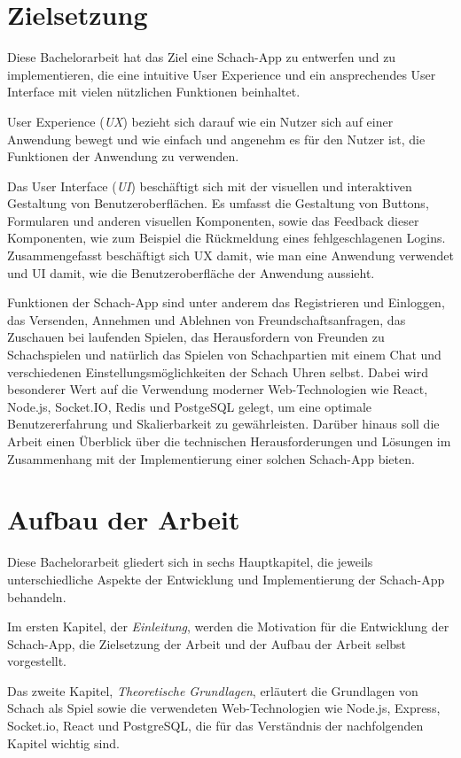 \documentclass[a4paper,12pt]{report}
\begin{document}
    \section{Zielsetzung}
    Diese Bachelorarbeit hat das Ziel eine Schach-App zu entwerfen und zu implementieren, die eine intuitive User Experience und ein ansprechendes User Interface mit vielen nützlichen Funktionen beinhaltet.
    
    User Experience (\textit{UX}) bezieht sich darauf wie ein Nutzer sich auf einer Anwendung bewegt und wie einfach und angenehm es für den Nutzer ist, die Funktionen der Anwendung zu verwenden.
    
    Das User Interface (\textit{UI}) beschäftigt sich mit der visuellen und interaktiven Gestaltung von Benutzeroberflächen. Es umfasst die Gestaltung von Buttons, Formularen und anderen visuellen Komponenten, sowie das Feedback dieser Komponenten, wie zum Beispiel die Rückmeldung eines fehlgeschlagenen Logins.
    Zusammengefasst beschäftigt sich UX damit, wie man eine Anwendung verwendet und UI damit, wie die Benutzeroberfläche der Anwendung aussieht.\cite{webdesign}
        
        Funktionen der Schach-App sind unter anderem das Registrieren und Einloggen, das Versenden, Annehmen und Ablehnen von Freundschaftsanfragen, das Zuschauen bei laufenden Spielen, das Herausfordern von Freunden zu Schachspielen und natürlich das Spielen von Schachpartien mit einem Chat und verschiedenen Einstellungsmöglichkeiten der Schach Uhren selbst.
    Dabei wird besonderer Wert auf die Verwendung moderner Web-Technologien wie React, Node.js, Socket.IO, Redis und PostgeSQL gelegt, um eine optimale Benutzererfahrung und Skalierbarkeit zu gewährleisten. Darüber hinaus soll die Arbeit einen Überblick über die technischen Herausforderungen und Lösungen im Zusammenhang mit der Implementierung einer solchen Schach-App bieten.
    
    \section{Aufbau der Arbeit}
Diese Bachelorarbeit gliedert sich in sechs Hauptkapitel, die jeweils unterschiedliche Aspekte der Entwicklung und Implementierung der Schach-App behandeln.

Im ersten Kapitel, der \textit{Einleitung}, werden die Motivation für die Entwicklung der Schach-App, die Zielsetzung der Arbeit und der Aufbau der Arbeit selbst vorgestellt.

Das zweite Kapitel, \textit{Theoretische Grundlagen}, erläutert die Grundlagen von Schach als Spiel sowie die verwendeten Web-Technologien wie Node.js, Express, Socket.io, React und PostgreSQL, die für das Verständnis der nachfolgenden Kapitel wichtig sind.
\end{document}
